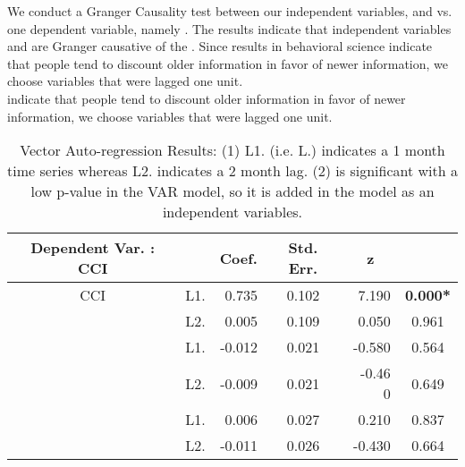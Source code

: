 \documentclass[10pt]{article}
\begin{document}
We conduct a  Granger Causality test \cite{Granger1969} between our independent variables,  and  vs. one dependent variable, namely .
The results indicate that independent variables  and  are Granger causative of the . Since results in behavioral science \cite{Barberis1998} indicate that people tend to discount older information in favor of newer information, we choose variables that were lagged one unit.\\

\cite{Barberis1998} indicate that people tend to discount older information in favor of newer information, we choose variables that were lagged one unit.\\
\begin{table}
\begin{center}
\begin{tabular}{clrcrc}
\hline
    Dependent Var. : CCI   &  			         &	Coef.	&	Std. Err.	&	z\   \	    &		\\
\hline
                             CCI      &	            L1.	&	0.735	&	0.102	&	7.190	 &	\textbf{0.000*}	\\
	                                   &	            L2.	&	0.005	&	0.109       &	0.050	 &	0.961	\\
                                 &	            L1.	&	-0.012	&	0.021	&	-0.580	&	0.564	\\
	                                  &                  L2.       &	-0.009	&	0.021	&	-0.46	0      &	0.649	\\
                                &	            L1.	&	0.006	&	0.027	&	0.210	&	0.837	\\
	                                  &	            L2.	&	-0.011	&	0.026	&	-0.430	&	0.664	\\
\hline
\end{tabular}
\caption{\label{VARdata}Vector Auto-regression Results: (1) L1. (i.e. L.) indicates a 1 month time series whereas L2. indicates a 2 month lag. (2)  is significant with a low p-value in the VAR model, so it is added in the model as an independent variables. }
\end{center}
\end{table}
\end{document}
